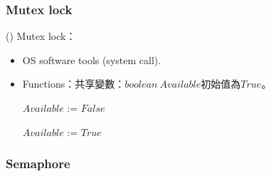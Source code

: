 \subsubsection{Mutex lock}

\begin{theorem}{()} Mutex lock：\begin{itemize}
        \item OS software tools (system call).
        \item Functions：共享變數：$boolean \ Available$初始值為$True$。
        \begin{algorithm}[H]
            \caption{$acquire()$.}
            \begin{algorithmic}[1]
                    \EndWhile
                    \State $Available$ := $False$
                \EndFunction
            \end{algorithmic}
        \end{algorithm}
        \begin{algorithm}[H]
            \caption{$release()$.}
            \begin{algorithmic}[1]
                    \State $Available$ := $True$
                \EndFunction
            \end{algorithmic}
        \end{algorithm}
    \end{itemize}
\end{theorem}

\subsubsection{Semaphore}

